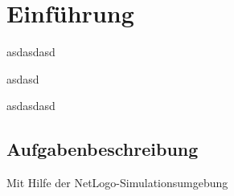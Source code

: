 \chapter{Einf\"uhrung}
\setcounter{page}{1}

%

asdasdasd\cite{Amundson.}


asdasd

asdasdasd\cite{Jonathan.2004}

\section{Aufgabenbeschreibung}

Mit Hilfe der NetLogo-Simulationsumgebung \cite{Netlogo.1999}

